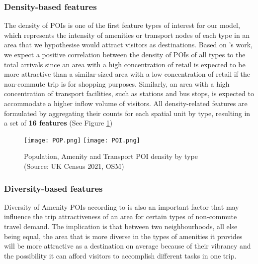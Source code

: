\subsubsection*{Density-based features}

The density of POIs is one of the first feature types of interest for our model, which represents the intensity of amenities or transport nodes of each type in an area that we hypothesise would attract visitors as destinations. Based on \citet{cerveroTravelDemand3Ds1997}'s work, we expect a positive correlation between the density of POIs of all types to the total arrivals since an area with a high concentration of retail is expected to be more attractive than a similar-sized area with a low concentration of retail if the non-commute trip is for shopping purposes. Similarly, an area with a high concentration of transport facilities, such as stations and bus stops, is expected to accommodate a higher inflow volume of visitors. All density-related features are formulated by aggregating their counts for each spatial unit by type, resulting in a set of \textbf{16 features} (See Figure \ref{fig:poppoi})

\begin{figure}
    \centering
    \texttt{[image: POP.png]}
    \texttt{[image: POI.png]}
    \captionsetup{justification=centering}
    \caption{Population, Amenity and Transport POI density by type\\(Source: UK Census 2021, OSM)}
    \label{fig:poppoi}
\end{figure}

\pagebreak[4] %
\subsubsection*{Diversity-based features}

Diversity of Amenity POIs according to \citet{cerveroTravelDemand3Ds1997} is also an important factor that may influence the trip attractiveness of an area for certain types of non-commute travel demand. The implication is that between two neighbourhoods, all else being equal, the area that is more diverse in the types of amenities it provides will be more attractive as a destination on average because of their vibrancy and the possibility it can afford visitors to accomplish different tasks in one trip.

